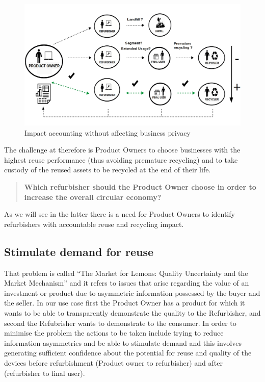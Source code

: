 \documentclass[
]{book}
\begin{document}
\begin{figure}

{\centering \includegraphics[width=1\linewidth]{./figs/28} 

}

\caption{Impact accounting without affecting business privacy}\label{fig:figreuseimpact}
\end{figure}

The challenge at therefore is Product Owners to choose businesses with the highest reuse performance (thus avoiding premature recycling) and to take custody of the reused assets to be recycled at the end of their life.

\begin{quote}
\textbf{Which refurbisher should the Product Owner choose in order to increase the overall circular economy?}
\end{quote}

As we will see in the latter there is a need for Product Owners to identify refurbishers with accountable reuse and recycling impact.

\hypertarget{stimulate-demand-for-reuse}{%
\subsection{Stimulate demand for reuse}\label{stimulate-demand-for-reuse}}

That problem is called ``The Market for Lemons: Quality Uncertainty and the Market Mechanism'' \citep{AKERLOF1978} and it refers to issues that arise regarding the value of an investment or product due to asymmetric information possessed by the buyer and the seller. In our use case first the Product Owner has a product for which it wants to be able to transparently demonstrate the quality to the Refurbisher, and second the Refubrisher wants to demonstrate to the consumer. In order to minimise the problem the actions to be taken include trying to reduce information asymmetries and be able to stimulate demand and this involves generating sufficient confidence about the potential for reuse and quality of the devices before refurbishment (Product owner to refurbisher) and after (refurbisher to final user).
\end{document}
